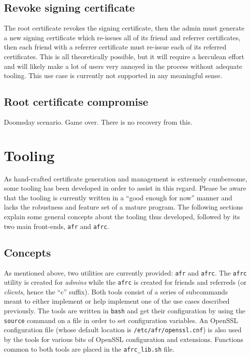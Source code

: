 \documentclass{article}
\begin{document}
\subsection{Revoke signing certificate}
\label{revoke-signing}
The root certificate revokes the signing certificate, then the admin must generate a new signing certificate which re-issues all of its friend and referrer certificates, then each friend with a referrer certificate must re-issue each of its referred certificates.  This is all theoretically possible, but it will require a herculean effort and will likely make a lot of users very annoyed in the process without adequate tooling.  This use case is currently not supported in any meaningful sense.

\subsection{Root certificate compromise}
\label{revoke-root}
Doomsday scenario.  Game over.  There is no recovery from this.

\section{Tooling}
As hand-crafted certificate generation and management is extremely cumbersome, some tooling has been developed in order to assist in this regard.  Please be aware that the tooling is currently written in a ``good enough for now'' manner and lacks the robustness and feature set of a mature program.  The following sections explain some general concepts about the tooling thus developed, followed by its two main front-ends, \texttt{afr} and \texttt{afrc}.

\subsection{Concepts}
As mentioned above, two utilities are currently provided: \texttt{afr} and \texttt{afrc}.  The \texttt{afrc} utility is created for \emph{admins} while the \texttt{afrc} is created for friends and referreds (or \emph{clients}, hence the ``c'' suffix).  Both tools consist of a series of subcommands meant to either implement or help implement one of the use cases described previously.  The tools are written in \texttt{bash} and get their configuration by using the \texttt{source} command on a file in order to set configuration variables.  An OpenSSL configuration file (whose default location is \texttt{/etc/afr/openssl.cnf}) is also used by the tools for various bits of OpenSSL configuration and extensions.  Functions common to both tools are placed in the \texttt{afrc\_lib.sh} file.
\end{document}
